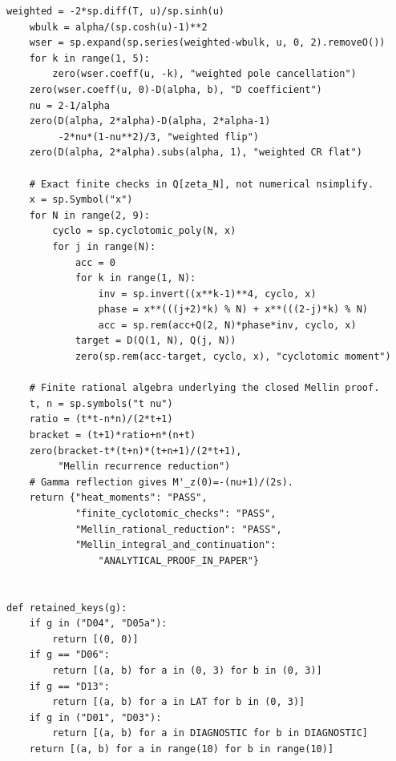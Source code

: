 \documentclass[11pt,a4paper]{article}
\theoremstyle{plain}
\theoremstyle{definition}
\theoremstyle{remark}
\numberwithin{equation}{section}
\begin{document}
\begin{lstlisting}[caption={Consolidated exact checker and coverage-aware optional replay.},
                  label={lst:program}]
    weighted = -2*sp.diff(T, u)/sp.sinh(u)
    wbulk = alpha/(sp.cosh(u)-1)**2
    wser = sp.expand(sp.series(weighted-wbulk, u, 0, 2).removeO())
    for k in range(1, 5):
        zero(wser.coeff(u, -k), "weighted pole cancellation")
    zero(wser.coeff(u, 0)-D(alpha, b), "D coefficient")
    nu = 2-1/alpha
    zero(D(alpha, 2*alpha)-D(alpha, 2*alpha-1)
         -2*nu*(1-nu**2)/3, "weighted flip")
    zero(D(alpha, 2*alpha).subs(alpha, 1), "weighted CR flat")

    # Exact finite checks in Q[zeta_N], not numerical nsimplify.
    x = sp.Symbol("x")
    for N in range(2, 9):
        cyclo = sp.cyclotomic_poly(N, x)
        for j in range(N):
            acc = 0
            for k in range(1, N):
                inv = sp.invert((x**k-1)**4, cyclo, x)
                phase = x**(((j+2)*k) % N) + x**(((2-j)*k) % N)
                acc = sp.rem(acc+Q(2, N)*phase*inv, cyclo, x)
            target = D(Q(1, N), Q(j, N))
            zero(sp.rem(acc-target, cyclo, x), "cyclotomic moment")

    # Finite rational algebra underlying the closed Mellin proof.
    t, n = sp.symbols("t nu")
    ratio = (t*t-n*n)/(2*t+1)
    bracket = (t+1)*ratio+n*(n+t)
    zero(bracket-t*(t+n)*(t+n+1)/(2*t+1),
         "Mellin recurrence reduction")
    # Gamma reflection gives M'_z(0)=-(nu+1)/(2s).
    return {"heat_moments": "PASS",
            "finite_cyclotomic_checks": "PASS",
            "Mellin_rational_reduction": "PASS",
            "Mellin_integral_and_continuation":
                "ANALYTICAL_PROOF_IN_PAPER"}


def retained_keys(g):
    if g in ("D04", "D05a"):
        return [(0, 0)]
    if g == "D06":
        return [(a, b) for a in (0, 3) for b in (0, 3)]
    if g == "D13":
        return [(a, b) for a in LAT for b in (0, 3)]
    if g in ("D01", "D03"):
        return [(a, b) for a in DIAGNOSTIC for b in DIAGNOSTIC]
    return [(a, b) for a in range(10) for b in range(10)]



\end{lstlisting}
\end{document}
